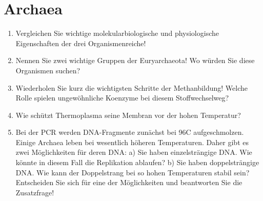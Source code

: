 \section{Archaea}
\begin{enumerate}
	\item Vergleichen Sie wichtige molekularbiologische und physiologische Eigenschaften der drei Organismenreiche!
	\item Nennen Sie zwei wichtige Gruppen der Euryarchaeota! Wo würden Sie diese Organismen suchen?
	\item Wiederholen Sie kurz die wichtigsten Schritte der Methanbildung! Welche Rolle spielen ungewöhnliche Koenzyme bei diesem Stoffwechselweg?
	\item Wie schützt Thermoplasma seine Membran vor der hohen Temperatur?
	\item Bei der PCR werden DNA-Fragmente zunächst bei 96\textdegree C aufgeschmolzen. Einige Archaea leben bei wesentlich höheren Temperaturen. Daher gibt es zwei Möglichkeiten für deren DNA:
a) Sie haben einzelsträngige DNA. Wie könnte in diesem Fall die Replikation ablaufen?
b) Sie haben doppelsträngige DNA. Wie kann der Doppelstrang bei so hohen Temperaturen stabil sein? Entscheiden Sie sich für eine der Möglichkeiten und beantworten Sie die Zusatzfrage!
\end{enumerate}
	
